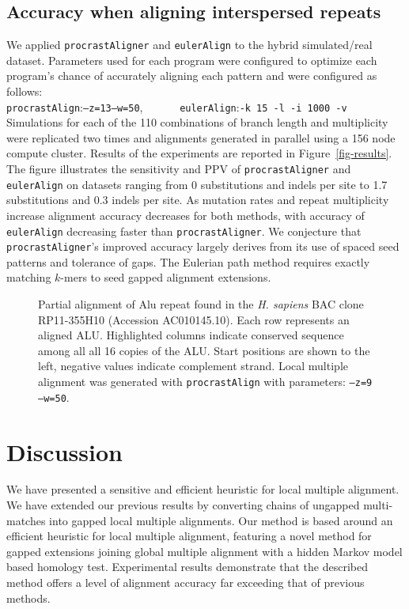 \documentclass{ws-procs975x65}
\begin{document}
\subsection{Accuracy when aligning interspersed repeats}
We applied \texttt{procrastAligner} and \texttt{eulerAlign} to the
hybrid simulated/real dataset.  Parameters used for each program were
configured to optimize each program's chance of accurately aligning
each pattern and were configured as
follows:\\\texttt{procrastAlign}:\texttt{--z=13--w=50},
\ \ \ \ \ \ \texttt{eulerAlign}:\texttt{-k 15 -l -i 1000 -v} \\
Simulations for each of the 110 combinations of branch length and
multiplicity were replicated two times and alignments generated in
parallel using a 156 node compute cluster.  Results of the experiments
are reported in Figure~\ref{fig-results}. The figure illustrates the
sensitivity and PPV of \texttt{procrastAligner} and
\texttt{eulerAlign} on datasets ranging from 0 substitutions and
indels per site to 1.7 substitutions and 0.3 indels per site.  As
mutation rates and repeat multiplicity increase alignment accuracy
decreases for both methods, with accuracy of \texttt{eulerAlign}
decreasing faster than \texttt{procrastAligner}.  We conjecture that
\texttt{procrastAligner}'s improved accuracy largely derives from its
use of spaced seed patterns\cite{ref-procrast} and tolerance of gaps.
The Eulerian path method requires exactly matching $k$-mers to seed
gapped alignment extensions.
\begin{figure}[t]
\centering {}
\vspace{-1.0cm}
\caption{Partial alignment of Alu repeat found in the \emph{H. sapiens} BAC
clone RP11-355H10 (Accession AC010145.10). Each row represents an
aligned ALU. Highlighted columns indicate conserved sequence among all
all 16 copies of the ALU. Start positions are shown to the left, negative
values indicate complement strand.  Local multiple alignment was
generated with \texttt{procrastAlign} with parameters: \texttt{--z=9
--w=50}.  }
\label{fig-align}
\end{figure}

\section{Discussion}
We have presented a sensitive and efficient heuristic for local
multiple alignment. We have extended our previous results by
converting chains of ungapped multi-matches into gapped local multiple
alignments. Our method is based around an efficient heuristic for
local multiple alignment, featuring a novel method for gapped
extensions joining global multiple alignment with a hidden Markov
model based homology test.  Experimental results demonstrate that the
described method offers a level of alignment accuracy far exceeding
that of previous methods.
\end{document}
